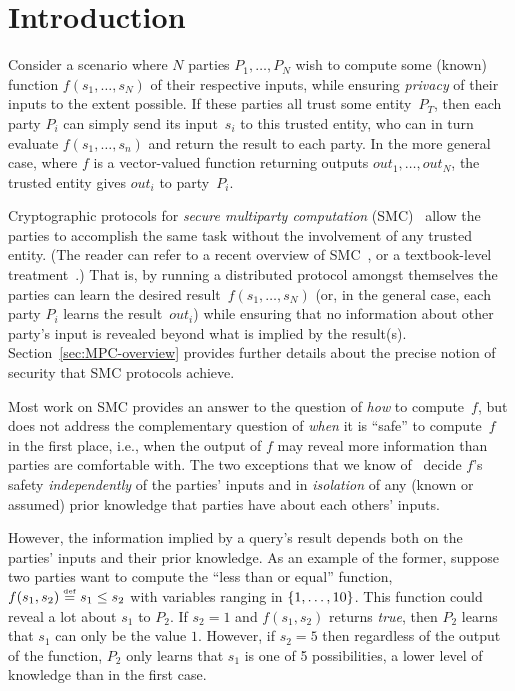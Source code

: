 \documentclass[10pt]{sigplanconf}
\begin{document}

\section{Introduction}
Consider a scenario where $N$ parties $P_1, \ldots, P_N$ wish to
compute some (known) function $f(s_1, \ldots, s_N)$ of their
respective inputs, while ensuring \emph{privacy} of their inputs to
the extent possible.  If these parties all trust some entity~$P_T$,
then each party $P_i$ can simply send its input~$s_i$ to this trusted
entity, who can in turn evaluate $f(s_1, \ldots, s_n)$ and return the
result to each party.  In the more general case, where $f$ is a
vector-valued function returning outputs $out_1,\ldots,out_N$, the
trusted entity gives $out_i$ to party~$P_i$.

Cryptographic protocols for \emph{secure multiparty computation}
(SMC)~\cite{Yao86,GMW87} allow the parties to accomplish the same task
without the involvement of any trusted entity.  (The reader can refer
to a recent overview of SMC~\cite{LindellPinkasPPDM}, or a
textbook-level treatment~\cite{Goldreich04}.)  That is, by running a
distributed protocol amongst themselves the parties can learn the
desired result~$f(s_1, \ldots, s_N)$ (or, in the general case, each
party $P_i$ learns the result~$out_i$) while ensuring that no
information about other party's input is revealed beyond what is
implied by the result(s).  Section~\ref{sec:MPC-overview} provides
further details about the precise notion of security that SMC
protocols achieve.

Most work on SMC provides an answer to the question of \emph{how} to
compute~$f$, but does not address the complementary question of
\emph{when} it is ``safe'' to compute~$f$ in the first place, i.e.,
when the output of $f$ may reveal more information than parties are
comfortable with.  The two exceptions that we know
of~\cite{EC:DKMMN06,C:BeiNisOmr08} decide $f$'s safety
\emph{independently} of the parties' inputs and in \emph{isolation} of
any (known or assumed) prior knowledge that parties have about each
others' inputs. 

However, the information implied by a query's result depends both on the parties'
inputs and their prior knowledge. As an example of the former, suppose
two parties want to compute the ``less than or equal'' function,
$f(s_1, s_2) \stackrel{\smash{\scriptscriptstyle \mathrm{def}}}= s_1 \leq s_2$ with variables ranging in $ \left\{ 1, \ldots,
  10 \right\} $.  This function could reveal a lot about $ s_1 $ to $ P_2
$. If $s_2=1$ and $f(s_1, s_2)$ returns \emph{true}, then $P_2$ learns
that $s_1$ can only be the value $1$. However, if $s_2=5$ then
regardless of the output of the function, $P_2$ only learns that $s_1$
is one of 5 possibilities, a lower level of knowledge than in the
first case.
\end{document}
